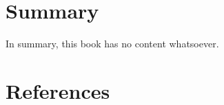 \documentclass[
  letterpaper,
  DIV=11,
  numbers=noendperiod,
  oneside]{scrreprt}
\newlength{\cslhangindent}
\newenvironment{CSLReferences}[2] %
 {\begin{list}{}{%
  \setlength{\itemindent}{0pt}
  \setlength{\leftmargin}{0pt}
  \setlength{\parsep}{0pt}
  \ifodd #1
   \setlength{\leftmargin}{\cslhangindent}
   \setlength{\itemindent}{-1\cslhangindent}
  \fi
  \setlength{\itemsep}{#2\baselineskip}}}
 {\end{list}}
\begin{document}

\chapter{Summary}\label{summary}

In summary, this book has no content whatsoever.


\chapter*{References}\label{references}


\label{refs}
\begin{CSLReferences}{0}{1}
\end{CSLReferences}
\end{document}
